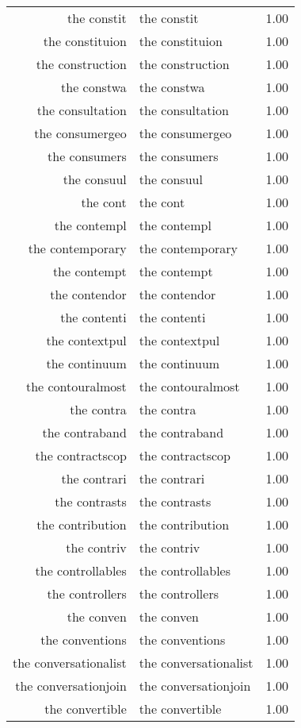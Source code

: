 \begin{table}[ht]
\begin{tabular}{rlr}
  the constit & the constit & 1.00 \\ 
  the constituion & the constituion & 1.00 \\ 
  the construction & the construction & 1.00 \\ 
  the constwa & the constwa & 1.00 \\ 
  the consultation & the consultation & 1.00 \\ 
  the consumergeo & the consumergeo & 1.00 \\ 
  the consumers & the consumers & 1.00 \\ 
  the consuul & the consuul & 1.00 \\ 
  the cont & the cont & 1.00 \\ 
  the contempl & the contempl & 1.00 \\ 
  the contemporary & the contemporary & 1.00 \\ 
  the contempt & the contempt & 1.00 \\ 
  the contendor & the contendor & 1.00 \\ 
  the contenti & the contenti & 1.00 \\ 
  the contextpul & the contextpul & 1.00 \\ 
  the continuum & the continuum & 1.00 \\ 
  the contouralmost & the contouralmost & 1.00 \\ 
  the contra & the contra & 1.00 \\ 
  the contraband & the contraband & 1.00 \\ 
  the contractscop & the contractscop & 1.00 \\ 
  the contrari & the contrari & 1.00 \\ 
  the contrasts & the contrasts & 1.00 \\ 
  the contribution & the contribution & 1.00 \\ 
  the contriv & the contriv & 1.00 \\ 
  the controllables & the controllables & 1.00 \\ 
  the controllers & the controllers & 1.00 \\ 
  the conven & the conven & 1.00 \\ 
  the conventions & the conventions & 1.00 \\ 
  the conversationalist & the conversationalist & 1.00 \\ 
  the conversationjoin & the conversationjoin & 1.00 \\ 
  the convertible & the convertible & 1.00 \\ 

\end{tabular}
\end{table}
